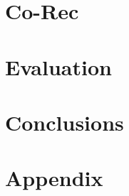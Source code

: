 \documentclass[12pt, twoside]{report}
\begin{document}
    \chapter{Co-Rec}
    
    
    \chapter{Evaluation}
    
    
    \chapter{Conclusions}
    
    
    \appendix
    \chapter{Appendix}
    
    
    \printbibliography
\end{document}
